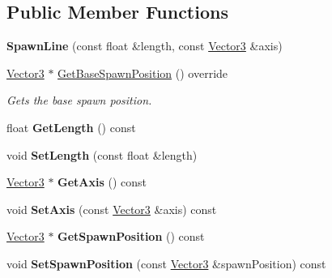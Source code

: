 \subsection*{Public Member Functions}
\begin{DoxyCompactItemize}
\item 
\mbox{\label{class_flounder_1_1_spawn_line_a30a5c661b5f919aa032a9e23a3015ba8}} 
{\bfseries Spawn\+Line} (const float \&length, const \hyperlink{class_flounder_1_1_vector3}{Vector3} \&axis)
\item 
\hyperlink{class_flounder_1_1_vector3}{Vector3} $\ast$ \hyperlink{class_flounder_1_1_spawn_line_a02c7783fe92ef1845953d5459f7bad7b}{Get\+Base\+Spawn\+Position} () override
\begin{DoxyCompactList}\small\item\em Gets the base spawn position. \end{DoxyCompactList}\item 
\mbox{\label{class_flounder_1_1_spawn_line_ae2cbb9abcdef12050ec2c4882691473f}} 
float {\bfseries Get\+Length} () const
\item 
\mbox{\label{class_flounder_1_1_spawn_line_ac62e92e43ba7def3c32c6dc92f4fa1fe}} 
void {\bfseries Set\+Length} (const float \&length)
\item 
\mbox{\label{class_flounder_1_1_spawn_line_a0fe3ca0c839e8fbe3df3846f4c1d7197}} 
\hyperlink{class_flounder_1_1_vector3}{Vector3} $\ast$ {\bfseries Get\+Axis} () const
\item 
\mbox{\label{class_flounder_1_1_spawn_line_a09e684cbb5d7e3de1be7b2f7e5404ffa}} 
void {\bfseries Set\+Axis} (const \hyperlink{class_flounder_1_1_vector3}{Vector3} \&axis) const
\item 
\mbox{\label{class_flounder_1_1_spawn_line_a9a975e31d88561bc5dba562ed6d8ed43}} 
\hyperlink{class_flounder_1_1_vector3}{Vector3} $\ast$ {\bfseries Get\+Spawn\+Position} () const
\item 
\mbox{\label{class_flounder_1_1_spawn_line_a4b957f9285bf343fb8e1db7b60280940}} 
void {\bfseries Set\+Spawn\+Position} (const \hyperlink{class_flounder_1_1_vector3}{Vector3} \&spawn\+Position) const
\end{DoxyCompactItemize}
